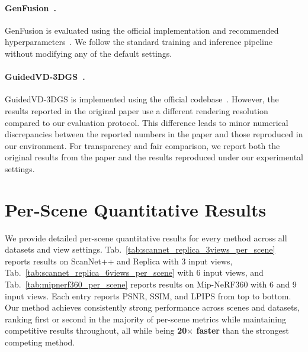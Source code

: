 \paragraph{GenFusion~\cite{wu2025genfusion}.}
GenFusion is evaluated using the official implementation and recommended hyperparameters~\cite{wu2025genfusion}. We follow the standard training and inference pipeline without modifying any of the default settings.

\paragraph{GuidedVD-3DGS~\cite{zhong2025taming}.}
GuidedVD-3DGS is implemented using the official codebase~\cite{zhong2025taming}. However, the results reported in the original paper use a different rendering resolution compared to our evaluation protocol. This difference leads to minor numerical discrepancies between the reported numbers in the paper and those reproduced in our environment. For transparency and fair comparison, we report both the original results from the paper and the results reproduced under our experimental settings.

\section{Per-Scene Quantitative Results}
\label{sec:per_scene}

We provide detailed per-scene quantitative results for every method across all datasets and view settings. Tab.~\ref{tab:scannet_replica_3views_per_scene} reports results on ScanNet++ and Replica with 3 input views, Tab.~\ref{tab:scannet_replica_6views_per_scene} with 6 input views, and Tab.~\ref{tab:mipnerf360_per_scene} reports results on Mip-NeRF360 with 6 and 9 input views. Each entry reports PSNR, SSIM, and LPIPS from top to bottom. Our method achieves consistently strong performance across scenes and datasets, ranking first or second in the majority of per-scene metrics while maintaining competitive results throughout, all while being \textbf{20$\times$ faster} than the strongest competing method.


